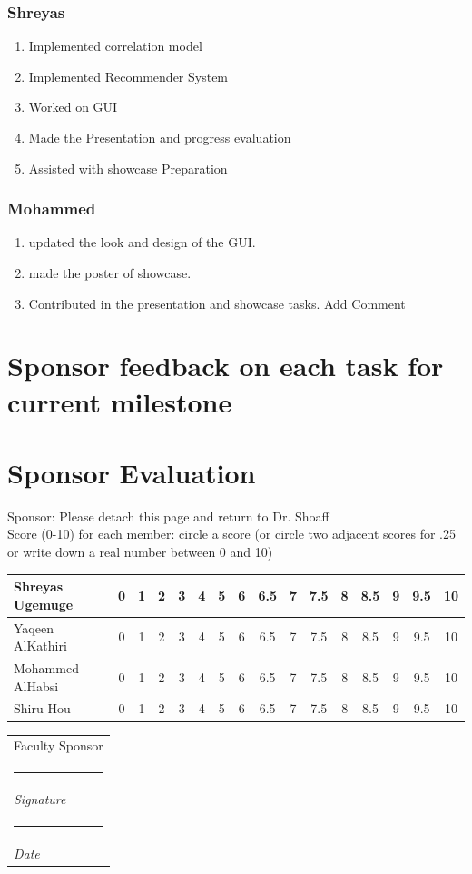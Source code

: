 \documentclass[12pt]{article}
\makeatletter
\newcommand{\namesigdate}[2][5cm]{%
  \begin{tabular}{@{}p{#1}@{}}
    #2 \\[2\normalbaselineskip] \hrule \\[0pt]
    {\small \textit{Signature}} \\ [2\normalbaselineskip] \hrule \\[0pt]
    {\small \textit{Date}}
  \end{tabular}
}
\makeatother
\begin{document}
	\subsubsection{Shreyas}
	\begin{enumerate}
		\item Implemented correlation model
		\item Implemented Recommender System
		\item Worked on GUI
		\item Made the Presentation and progress evaluation
		\item Assisted with showcase Preparation
	\end{enumerate}
	 
	\subsubsection{Mohammed}
	\begin{enumerate}
		\item updated the look and design of the GUI.
\item made the poster of showcase.
\item  Contributed in the presentation and showcase tasks.
Add Comment
	\end{enumerate}
	\pagebreak
	\section{Sponsor feedback on each task for current milestone}
	\pagebreak
	\section{Sponsor Evaluation}
	Sponsor: Please detach this page and return to Dr. Shoaff \\ \hfill \break 
	Score (0-10) for each member: circle a score (or circle two adjacent scores for .25 or write down a real number between 0 and 10) \\ \hfill \break
	\begin{tabularx}{\textwidth}{|X|c|c|c|c|c|c|c|c|c|c|c|c|c|c|c|}
	\hline
	Shreyas Ugemuge & 0 & 1 &  2 & 3 & 4 & 5 & 6 & 6.5 & 7 & 7.5 & 8 & 8.5 & 9 & 9.5 & 10 \\ \hline
	Yaqeen AlKathiri & 0 & 1 &  2 & 3 & 4 & 5 & 6 & 6.5 & 7 & 7.5 & 8 & 8.5 & 9 & 9.5 & 10 \\ \hline
	Mohammed AlHabsi & 0 & 1 &  2 & 3 & 4 & 5 & 6 & 6.5 & 7 & 7.5 & 8 & 8.5 & 9 & 9.5 & 10 \\ \hline
	Shiru Hou & 0 & 1 &  2 & 3 & 4 & 5 & 6 & 6.5 & 7 & 7.5 & 8 & 8.5 & 9 & 9.5 & 10 \\ 
	\hline 
	\end{tabularx}
	\hfil \break
	\hfil \break
	\namesigdate{Faculty Sponsor}
	
\end{document}
